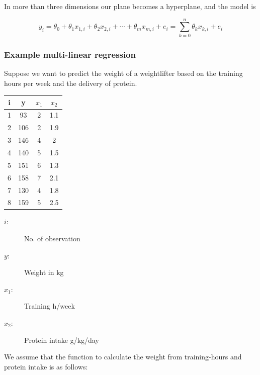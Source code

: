 \documentclass[11pt]{article}
\renewcommand*{\thead}[1]{\bfseries #1}
\begin{document}
In more than three dimensions our plane becomes a hyperplane, and the model is

\begin{equation*}
    y_i = \theta_0 + \theta_1 x_{1,i} + \theta_2 x_{2,i} + \cdots + \theta_m x_{m,i}  + e_i=\sum_{k=0}^{n}\theta_k x_{k,i} + e_i
\end{equation*}

\subsubsection{Example multi-linear regression}

Suppose we want to predict the weight of a weightlifter based on the training hours per week and the delivery of protein.

\vspace{10px}

\begin{minipage}{0.25\textwidth}
    \begin{tabular}{cccc}
        \toprule
        \thead{i} & \thead{y} & \thead{$x_1$} & \thead{$x_2$} \\
        \hline
        1         & 93        & 2             & 1.1           \\
        \hline
        2         & 106       & 2             & 1.9           \\
        \hline
        3         & 146       & 4             & 2             \\
        \hline
        4         & 140       & 5             & 1.5           \\
        \hline
        5         & 151       & 6             & 1.3           \\
        \hline
        6         & 158       & 7             & 2.1           \\
        \hline
        7         & 130       & 4             & 1.8           \\
        \hline
        8         & 159       & 5             & 2.5           \\
        \bottomrule
    \end{tabular}
\end{minipage}\hfill
\begin{minipage}{0.75\textwidth}
    \begin{description}
        \item[$i$: ] No. of observation
        \item[$y$: ] Weight in kg
        \item[$x_1$: ] Training h/week
        \item[$x_2$: ] Protein intake g/kg/day
    \end{description}

    We assume that the function to calculate the weight from training-hours and protein intake is as follows:
\end{minipage}
\end{document}

